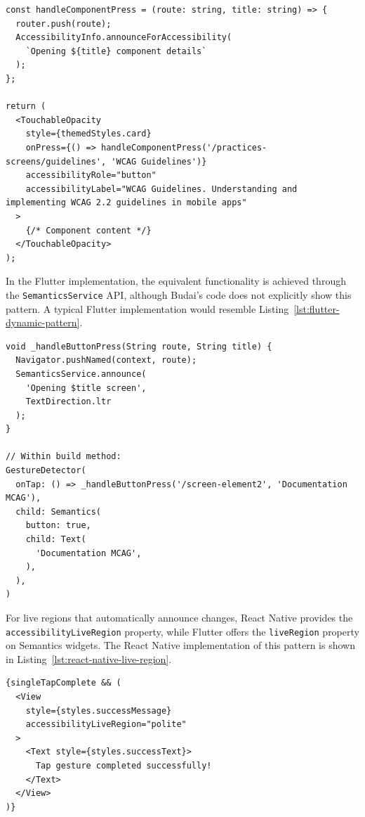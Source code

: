 \begin{lstlisting}[style=ReactNativeStyle, caption=Dynamic content announcement in React Native, label=lst:react-native-dynamic-pattern]
const handleComponentPress = (route: string, title: string) => {
  router.push(route);
  AccessibilityInfo.announceForAccessibility(
    `Opening ${title} component details`
  );
};

return (
  <TouchableOpacity
    style={themedStyles.card}
    onPress={() => handleComponentPress('/practices-screens/guidelines', 'WCAG Guidelines')}
    accessibilityRole="button"
    accessibilityLabel="WCAG Guidelines. Understanding and implementing WCAG 2.2 guidelines in mobile apps"
  >
    {/* Component content */}
  </TouchableOpacity>
);
\end{lstlisting}

\pagebreak

In the Flutter implementation, the equivalent functionality is achieved through the \texttt{SemanticsService} API, although Budai's code does not explicitly show this pattern. A typical Flutter implementation would resemble Listing~\ref{lst:flutter-dynamic-pattern}.

\begin{lstlisting}[style=DartStyle, caption=Dynamic content announcement in Flutter, label=lst:flutter-dynamic-pattern]
void _handleButtonPress(String route, String title) {
  Navigator.pushNamed(context, route);
  SemanticsService.announce(
    'Opening $title screen',
    TextDirection.ltr
  );
}

// Within build method:
GestureDetector(
  onTap: () => _handleButtonPress('/screen-element2', 'Documentation MCAG'),
  child: Semantics(
    button: true,
    child: Text(
      'Documentation MCAG',
    ),
  ),
)
\end{lstlisting}

\pagebreak

For live regions that automatically announce changes, React Native provides the \\ \texttt{accessibilityLiveRegion} property, while Flutter offers the \texttt{liveRegion} property on Semantics widgets. The React Native implementation of this pattern is shown in Listing~\ref{lst:react-native-live-region}.

\begin{lstlisting}[style=ReactNativeStyle, caption=Live region announcement in React Native, label=lst:react-native-live-region]
{singleTapComplete && (
  <View 
    style={styles.successMessage} 
    accessibilityLiveRegion="polite"
  >
    <Text style={styles.successText}>
      Tap gesture completed successfully!
    </Text>
  </View>
)}
\end{lstlisting}

